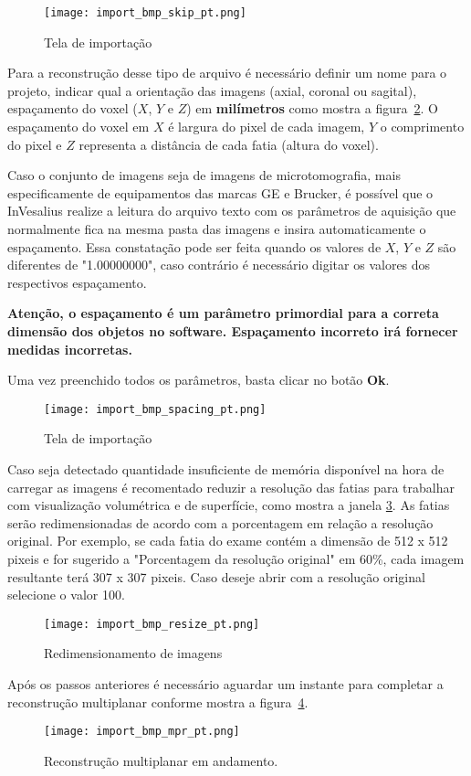 \begin{figure}[!htb]
\centering
\texttt{[image: import\_bmp\_skip\_pt.png]}
\caption{Tela de importação}
\label{fig:import_bmp_skip_pt}
\end{figure}

Para a reconstrução desse tipo de arquivo é necessário definir um nome para o projeto, indicar qual a orientação das imagens (axial, coronal ou sagital), espaçamento do voxel ($X$, $Y$ e $Z$) em \textbf{milímetros} como mostra a figura~\ref{fig:import_bmp_spacing_pt}. O espaçamento do voxel em $X$ é largura do pixel de cada imagem, $Y$ o comprimento do pixel e $Z$ representa a distância de cada fatia (altura do voxel). 

Caso o conjunto de imagens seja de imagens de microtomografia, mais especificamente de equipamentos das marcas GE e Brucker, é possível que o InVesalius realize a leitura do arquivo texto com os parâmetros de aquisição que normalmente fica na mesma pasta das imagens e insira automaticamente o espaçamento. Essa constatação pode ser feita quando os valores de $X$, $Y$ e $Z$ são diferentes de "1.00000000", caso contrário é necessário digitar os valores dos respectivos espaçamento. 

\textbf{Atenção, o espaçamento é um parâmetro primordial para a correta dimensão dos objetos no software. Espaçamento incorreto irá fornecer medidas incorretas.}

Uma vez preenchido todos os parâmetros, basta clicar no botão \textbf{Ok}.

\begin{figure}[!htb]
\centering
\texttt{[image: import\_bmp\_spacing\_pt.png]}
\caption{Tela de importação}
\label{fig:import_bmp_spacing_pt}
\end{figure}

Caso seja detectado quantidade insuficiente de memória disponível na hora de carregar as imagens é recomentado  reduzir a resolução das fatias para trabalhar com visualização volumétrica e de superfície, como mostra a janela \ref{fig:import_bmp_resize_pt}.  As fatias serão redimensionadas de acordo com a porcentagem em relação a resolução original. Por exemplo,  se cada fatia do exame contém a dimensão de 512 x 512 pixeis e for sugerido a "Porcentagem da resolução original" em 60\%, cada imagem resultante terá 307 x 307 pixeis. Caso deseje abrir com a resolução original selecione o valor 100.

\begin{figure}[!htb]
\centering
\texttt{[image: import\_bmp\_resize\_pt.png]}
\caption{Redimensionamento de imagens}
\label{fig:import_bmp_resize_pt}
\end{figure}

Após os passos anteriores é necessário aguardar um instante para completar a reconstrução multiplanar conforme mostra a figura~\ref{fig:import_bmp_mpr_pt.png}.

\begin{figure}[!htb]
\centering
\texttt{[image: import\_bmp\_mpr\_pt.png]}
\caption{Reconstrução multiplanar em andamento.}
\label{fig:import_bmp_mpr_pt.png}
\end{figure}